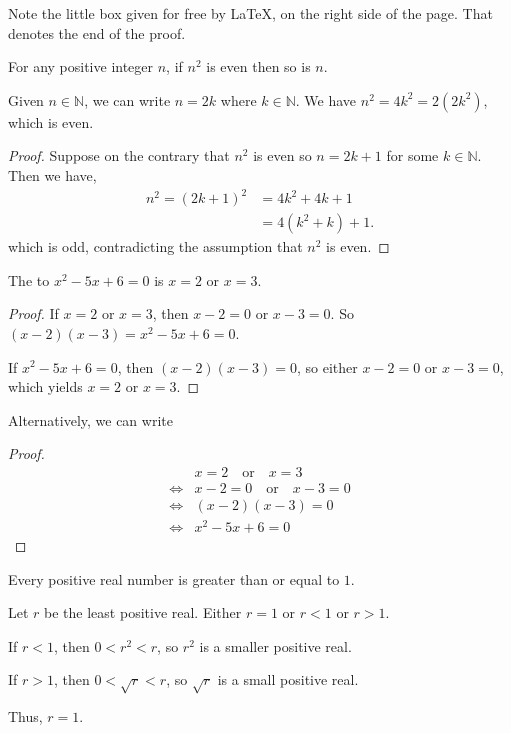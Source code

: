 \documentclass[12pt]{article}
\begin{document}
Note the little box given for free by \LaTeX, on the right side of the page.
That denotes the end of the proof.

\begin{claim}
    For any positive integer $n$, if $n^{2}$ is even then so is $n$.
\end{claim}
\begin{nonproof}
    Given $n \in \mathbb{N}$, we can write $n = 2k$ where $k \in \mathbb{N}$.
    We have $n^{2} = 4k^{2} = 2(2k^{2})$, which is even.
\end{nonproof}

\begin{proof}
    Suppose on the contrary that $n^{2}$ is even so $n = 2k+1$ for some $k \in \mathbb{N}$.
    Then we have,
    \[
    \begin{aligned}
        n^{2} = (2k+1)^{2} &= 4k^{2} + 4k + 1 \\
                     &= 4(k^{2} + k) + 1.
    \end{aligned}
    \]
    which is odd, contradicting the assumption that $n^{2}$ is even.
    \contra
\end{proof}

\begin{claim}
    The \sol{} to $x^{2} - 5x + 6 = 0$ is $x = 2$ or $x = 3$.
\end{claim}
\begin{proof}
    If $x = 2$ or $x = 3$,
    then $x - 2 = 0$ or $x - 3 = 0$.
    So $(x-2)(x-3) = x^{2} - 5x + 6 = 0$.

    If $x^{2}-5x+6=0$, then
    $(x-2)(x-3)=0$,
    so either $x-2=0$ or $x-3=0$,
    which yields $x=2$ or $x=3$.
\end{proof}

Alternatively, we can write
\begin{proof}
    \begin{align*}
        &x=2 \quad \text{or} \quad x=3\\
        \iff &x-2=0 \quad\text{or}\quad x-3=0 \\
        \iff &(x-2)(x-3)=0\\
        \iff &x^{2}-5x+6=0
    \end{align*}
\end{proof}

\begin{claim}
    Every positive real number is greater than or equal to $1$.
\end{claim}
\begin{nonproof}
    Let $r$ be the least positive real.
    Either $r = 1$ or $r < 1$ or $r > 1$.

    If $r < 1$, then $0 < r^{2} < r$, 
    so $r^{2}$ is a smaller positive real. \contra

    If $r > 1$, then $0 < \sqrt{r} < r$,
    so $\sqrt{r}$ is a small positive real. \contra
    
    Thus, $r = 1$.
\end{nonproof}
\end{document}
